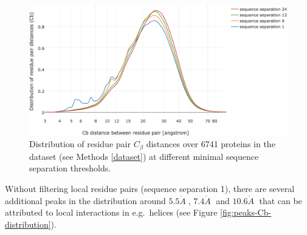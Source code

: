 \documentclass[12pt,a4paper,twoside]{book}
\newcommand{\Cb}{C_\beta}
\newcommand{\angstrom}{\mathring{A} \;}
\theoremstyle{definition}
\theoremstyle{definition}
\theoremstyle{remark}
\begin{document}
\begin{figure}

{\centering \includegraphics[width=0.9\linewidth]{img/dataset_statistics/Cb_distribution_all_data43579541_log} 

}

\caption{Distribution of residue pair \(\Cb\)
distances over 6741 proteins in the dataset (see Methods \ref{dataset})
at different minimal sequence separation thresholds.}\label{fig:Cb-distribution}
\end{figure}

Without filtering local residue pairs (sequence separation 1), there are
several additional peaks in the distribution around \(5.5\angstrom\),
\(7.4\angstrom\) and \(10.6\angstrom\) that can be attributed to local
interactions in e.g.~helices (see Figure
\ref{fig:peaks-Cb-distribution}).
\end{document}
